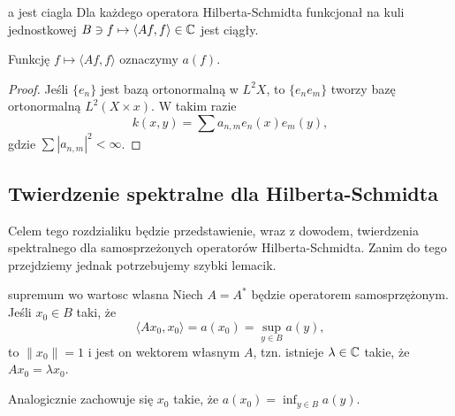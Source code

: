 \begin{lemma}{}{a jest ciagla}
  Dla każdego operatora Hilberta-Schmidta funkcjonał na kuli jednostkowej $B\ni f\mapsto \langle Af, f\rangle\in\mathbb{C}$ jest ciągły.
\end{lemma}

Funkcję $f\mapsto \langle Af, f\rangle$ oznaczymy $a(f)$.

\begin{proof}
  \color{red} Jeśli $\{e_n\}$ jest bazą ortonormalną w $L^2X$, to $\{e_ne_m\}$ tworzy bazę ortonormalną $L^2(X\times x)$. W takim razie
    $$k(x,y)=\sum a_{n,m}e_n(x)e_m(y),$$
    gdzie $\sum|a_{n,m}|^2<\infty$.
\end{proof}

\subsection{Twierdzenie spektralne dla Hilberta-Schmidta}

Celem tego rozdzialiku będzie przedstawienie, wraz z dowodem, twierdzenia spektralnego dla samosprzeżonych operatorów Hilberta-Schmidta. Zanim do tego przejdziemy jednak potrzebujemy szybki lemacik.

\begin{lemma}{}{supremum wo wartosc wlasna}
  Niech $A=A^*$ będzie operatorem samosprzężonym. Jeśli $x_0\in B$ taki, że
  $$\langle Ax_0, x_0\rangle=a(x_0)=\sup_{y\in B}a(y),$$
  to $\|x_0\|=1$ i jest on wektorem własnym $A$, tzn. istnieje $\lambda\in\mathbb{C}$ takie, że $Ax_0=\lambda x_0$.
\end{lemma}

Analogicznie zachowuje się $x_0$ takie, że $a(x_0)=\inf_{y\in B}a(y)$.

